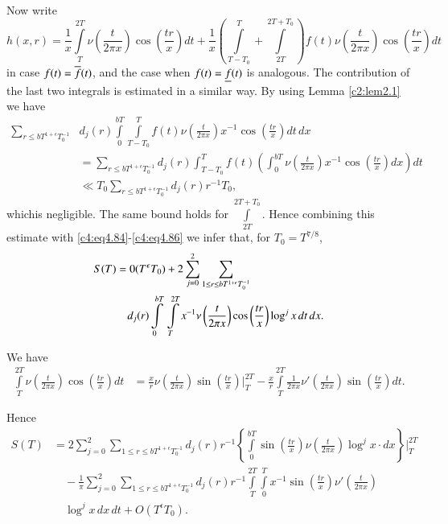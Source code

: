 Now write
{\fontsize{10}{12}\selectfont
$$
h (x, r) = \frac{1}{x} \int\limits_T^{2T} \nu \left( \frac{t}{2 \pi
  x}\right) \cos \left(\frac{tr}{x} \right) dt + \frac{1}{x}
\left(\int\limits_{T- T_0}^T  + \int\limits_{2T}^{2T +T_0}\right) f(t)
\nu \left(\frac{t}{2 \pi x} \right) \cos \left(\frac{tr}{x} \right)dt
$$}
in case $f(t) = \overline{f} (t)$, and the case when $f(t) = \underline{f} (t)$ is
analogous. The contribution of the last two integrals is estimated in
a similar way. By using Lemma \ref{c2:lem2.1} we have
\begin{align*}
  \sum_{r \leq bT^{1+ \epsilon}T_0^{-1}} & d_j (r) \int\limits_0^{bT}
  \int\limits_{T- T_0}^T f(t) \nu \left(\frac{t}{2 \pi x}
  \right)x^{-1} \cos \left(\frac{tr}{x} \right) dt\, dx\\[5pt]
  & = \sum_{r \leq bT^{1+ \epsilon}T_0^{-1}} d_j (r) \int^T_{T-T_0}
  f(t) \left(\int_0^{bT} \nu \left(\frac{t}{2\pi x} \right) x^{-1}
  \cos \left(\frac{tr}{x} \right)dx\right) dt\\[5pt]
  & \ll T_0 \sum_{r \leq bT^{1+ \epsilon} T_0^{-1}} d_j (r) r^{-1}T_0,
\end{align*}
which\pageoriginale is negligible. The same bound holds for
$\int\limits_{2T}^{2T + T_0}$. Hence combining this estimate with
\eqref{c4:eq4.84}-\eqref{c4:eq4.86} we infer that, for $T_0 =
T^{7/8}$, 
\begin{align}
  S(T) & = 0(T^\epsilon T_0) + 2 \sum_{j=0}^2 \sum_{1 \leq r \leq
    bT^{1+ \epsilon}T_0^{-1}}\label{c4:eq4.91}\\
  &\quad d_j (r) \int\limits_0^{bT} \, \int\limits_T^{2T} x^{-1} \nu
  \left(\frac{t}{2 \pi x} \right) \cos \left(\frac{tr}{x} \right)
  \log^j x \, dt\, dx.\notag
\end{align}

We have
{\fontsize{10pt}{12pt}\selectfont
\begin{align*}
  \int\limits_T^{2T} \nu \left(\frac{t}{2 \pi x} \right) \cos
  \left(\frac{tr}{x} \right) dt &= \frac{x}{r} \nu \left(\frac{t}{2 \pi
    x} \right) \sin \left(\frac{tr}{x} \right) \Bigg|_T^{2T}
-\frac{x}{r} \int\limits_T^{2T} \frac{1}{2 \pi x} \nu' \left(\frac{t}{2
    \pi x}\right) \sin \left(\frac{tr}{x} \right)dt.
\end{align*}}

Hence
\begin{align*}
  S(T) & = 2 \sum_{j=0}^2 \sum_{1 \leq r \leq bT^{1+ \epsilon}T_0^{-1}}
  d_j (r) r^{-1} \left\{\int\limits_{0}^{bT} \sin \left(\frac{tr}{x}
  \right) \nu \left(\frac{t}{2 \pi x}\right)\log^j x \cdot dx
  \right\}\Bigg|_{T}^{2T} \\
  &\quad- \frac{1}{\pi} \sum^2_{j=0} \sum_{1 \leq r \leq bT^{1+
      \epsilon}T_0^{-1}} d_j(r) r^{-1}
  \int\limits_T^{2T}\int\limits_0^T x^{-1} \sin \left(\frac{tr}{x}
  \right) \nu' \left(\frac{t}{2 \pi x} \right)\\ 
  & \quad\log^j x\, dx\, dt+  O(T^\epsilon T_0).
\end{align*}


